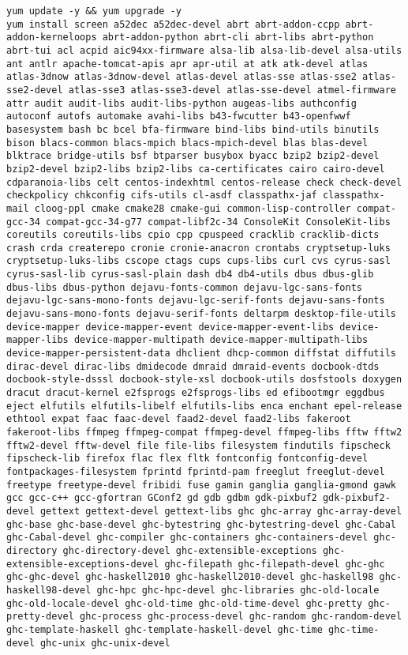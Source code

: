 \begin{lstlisting} 
yum update -y && yum upgrade -y
yum install screen a52dec a52dec-devel abrt abrt-addon-ccpp abrt-addon-kerneloops abrt-addon-python abrt-cli abrt-libs abrt-python abrt-tui acl acpid aic94xx-firmware alsa-lib alsa-lib-devel alsa-utils ant antlr apache-tomcat-apis apr apr-util at atk atk-devel atlas atlas-3dnow atlas-3dnow-devel atlas-devel atlas-sse atlas-sse2 atlas-sse2-devel atlas-sse3 atlas-sse3-devel atlas-sse-devel atmel-firmware attr audit audit-libs audit-libs-python augeas-libs authconfig autoconf autofs automake avahi-libs b43-fwcutter b43-openfwwf basesystem bash bc bcel bfa-firmware bind-libs bind-utils binutils bison blacs-common blacs-mpich blacs-mpich-devel blas blas-devel  blktrace bridge-utils bsf btparser busybox byacc bzip2 bzip2-devel bzip2-devel bzip2-libs bzip2-libs ca-certificates cairo cairo-devel cdparanoia-libs celt centos-indexhtml centos-release check check-devel checkpolicy chkconfig cifs-utils cl-asdf classpathx-jaf classpathx-mail cloog-ppl cmake cmake28 cmake-gui common-lisp-controller compat-gcc-34 compat-gcc-34-g77 compat-libf2c-34 ConsoleKit ConsoleKit-libs coreutils coreutils-libs cpio cpp cpuspeed cracklib cracklib-dicts crash crda createrepo cronie cronie-anacron crontabs cryptsetup-luks cryptsetup-luks-libs cscope ctags cups cups-libs curl cvs cyrus-sasl cyrus-sasl-lib cyrus-sasl-plain dash db4 db4-utils dbus dbus-glib dbus-libs dbus-python dejavu-fonts-common dejavu-lgc-sans-fonts dejavu-lgc-sans-mono-fonts dejavu-lgc-serif-fonts dejavu-sans-fonts dejavu-sans-mono-fonts dejavu-serif-fonts deltarpm desktop-file-utils device-mapper device-mapper-event device-mapper-event-libs device-mapper-libs device-mapper-multipath device-mapper-multipath-libs device-mapper-persistent-data dhclient dhcp-common diffstat diffutils dirac-devel dirac-libs dmidecode dmraid dmraid-events docbook-dtds docbook-style-dsssl docbook-style-xsl docbook-utils dosfstools doxygen dracut dracut-kernel e2fsprogs e2fsprogs-libs ed efibootmgr eggdbus eject elfutils elfutils-libelf elfutils-libs enca enchant epel-release ethtool expat faac faac-devel faad2-devel faad2-libs fakeroot fakeroot-libs ffmpeg ffmpeg-compat ffmpeg-devel ffmpeg-libs fftw fftw2 fftw2-devel fftw-devel file file-libs filesystem findutils fipscheck fipscheck-lib firefox flac flex fltk fontconfig fontconfig-devel fontpackages-filesystem fprintd fprintd-pam freeglut freeglut-devel freetype freetype-devel fribidi fuse gamin ganglia ganglia-gmond gawk gcc gcc-c++ gcc-gfortran GConf2 gd gdb gdbm gdk-pixbuf2 gdk-pixbuf2-devel gettext gettext-devel gettext-libs ghc ghc-array ghc-array-devel ghc-base ghc-base-devel ghc-bytestring ghc-bytestring-devel ghc-Cabal ghc-Cabal-devel ghc-compiler ghc-containers ghc-containers-devel ghc-directory ghc-directory-devel ghc-extensible-exceptions ghc-extensible-exceptions-devel ghc-filepath ghc-filepath-devel ghc-ghc ghc-ghc-devel ghc-haskell2010 ghc-haskell2010-devel ghc-haskell98 ghc-haskell98-devel ghc-hpc ghc-hpc-devel ghc-libraries ghc-old-locale ghc-old-locale-devel ghc-old-time ghc-old-time-devel ghc-pretty ghc-pretty-devel ghc-process ghc-process-devel ghc-random ghc-random-devel ghc-template-haskell ghc-template-haskell-devel ghc-time ghc-time-devel ghc-unix ghc-unix-devel 
\end{lstlisting}
